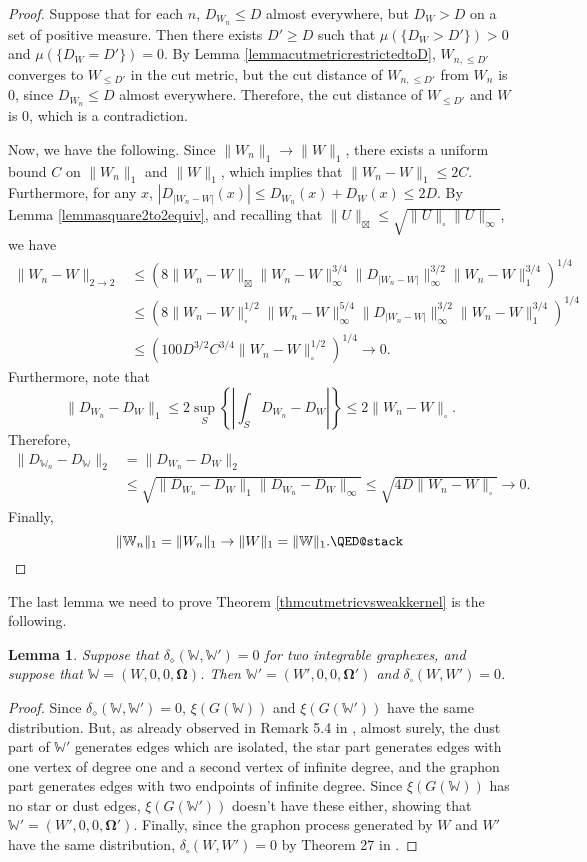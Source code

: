 \documentclass{amsart}
\numberwithin{equation}{section}
\numberwithin{figure}{section}
\newtheorem{lemma}[theorem]{Lemma}
\theoremstyle{definition}
\theoremstyle{remark}
\newcommand{\jbl}{{\boxtimes}}
\newcommand{\bOmega}{{\mathbf{\Omega}}}
\newcommand{\cW}{\mathbb{W}}
\def\delGP{\delta_\diamond}
\begin{document}
\begin{proof}
Suppose that for each $n$, $D_{W_n} \le D$ almost everywhere, but $D_W>D$ on
a set of positive measure. Then there exists $D' \ge D$ such that
$\mu(\{D_W>D'\})>0$ and $\mu(\{D_W=D'\})=0$. By Lemma
\ref{lemmacutmetricrestrictedtoD}, $W_{n,\le D'}$ converges to $W_{\le D'}$
in the cut metric, but the cut distance of $W_{n,\le D'}$ from $W_n$ is $0$,
since $D_{W_n} \le D$ almost everywhere. Therefore, the cut distance of
$W_{\le D'}$ and $W$ is $0$, which is a contradiction.

Now, we have the following. Since $\|W_n\|_1 \rightarrow \|W\|_1$, there
exists a uniform bound $C$ on $\|W_n\|_1$ and $\|W\|_1$, which implies that
$\|W_n-W\|_1 \le 2C$. Furthermore, for any $x$, $|D_{|W_n-W|}(x)| \le
D_{W_n}(x)+D_W(x) \le 2D$. By Lemma \ref{lemmasquare2to2equiv}, and recalling
that $\|U\|_{\jbl} \le \sqrt{\|U\|_\square\|U\|_\infty}$, we have
\begin{align*}
\|W_n - W\|_{2\to2} &\le \left(8\|W_n-W\|_{\jbl}\|W_n-W\|_\infty^{3/4}\|D_{|W_n-W|}\|_\infty^{3/2}\|W_n-W\|_1^{3/4}\right)^{1/4}\\
&\le
\left(8\|W_n-W\|_{\square}^{1/2}\|W_n-W\|_\infty^{5/4}\|D_{|W_n-W|}\|_\infty^{3/2}\|W_n-W\|_1^{3/4}\right)^{1/4}\\
&\le \left(100D^{3/2}C^{3/4}\|W_n-W\|_{\square}^{1/2}\right)^{1/4} \to 0
.
\end{align*}
Furthermore, note that
\[\|D_{W_n}-D_W\|_1 \le 2 \sup_S\left\{\left|\int_S D_{W_n}-D_W \right|\right\} \le 2\|W_n-W\|_\square
.\] Therefore,
\begin{align*}
\|D_{\cW_n}-D_{\cW}\|_2 &= \|D_{W_n}-D_W\|_2\\
& \le
\sqrt{\|D_{W_n}-D_W\|_1\|D_{W_n}-D_W\|_\infty}
 \le \sqrt{4D\|W_n-W\|_\square}\to 0 .
\end{align*}
Finally,
\[\|\cW_n\|_1 = \|W_n\|_1 \to \|W\|_1=\|\cW\|_1
. \qedhere\]
\end{proof}

The last lemma we need to prove Theorem \ref{thmcutmetricvsweakkernel} is the
following.

\begin{lemma} \label{lemmadelgp0cut0}
Suppose that $\delGP(\cW,\cW')=0$ for two integrable graphexes, and suppose
that $\cW=(W,0,0,\bOmega)$. Then $\cW'=(W',0,0,\bOmega')$ and
$\delta_\square(W,W')=0$.
\end{lemma}

\begin{proof}
Since $\delGP(\cW,\cW')=0$, $\xi(G(\cW))$ and $\xi(G(\cW'))$ have the same
distribution. But, as already observed in Remark 5.4 in \cite{JANSON16},
almost surely, the dust part of $\cW'$ generates edges which are isolated,
the star part generates edges with one vertex of degree one and a second
vertex of infinite degree, and the graphon part generates edges with two
endpoints of infinite degree. Since $\xi(G(\cW))$ has no star or dust edges,
$\xi(G(\cW'))$ doesn't have these either, showing that
$\cW'=(W',0,0,\bOmega')$. Finally, since the graphon process generated by $W$
and $W'$ have the same distribution, $\delta_\square(W,W')=0$ by Theorem 27
in \cite{BCCH16}.
\end{proof}
\end{document}
